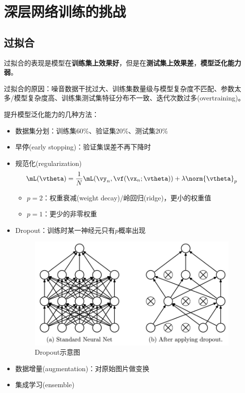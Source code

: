 
\section{深层网络训练的挑战} %
\subsection{过拟合}
过拟合的表现是模型在\textbf{训练集上效果好}，但是在\textbf{测试集上效果差}，\textbf{模型泛化能力弱}。

过拟合的原因：噪音数据干扰过大、训练集数量级与模型复杂度不匹配、参数太多/模型复杂度高、训练集测试集特征分布不一致、迭代次数过多(overtraining)。

提升模型泛化能力的几种方法：
\begin{itemize}
    \item 数据集分划：训练集60\%、验证集20\%、测试集20\%
    \item 早停(early stopping)：验证集误差不再下降时
    \item 规范化(regularization)
    \[\mL(\vtheta)=\frac{1}{N}\mL(\vy_n,\vf(\vx_n;\vtheta))+\lambda\norm{\vtheta}_p\]
    \begin{itemize}
        \item $p=2$：权重衰减(weight decay)/岭回归(ridge)，更小的权重值
        \item $p=1$：更少的非零权重
    \end{itemize}
    \item Dropout：训练时某一神经元只有$p$概率出现
    \begin{figure}[H]
        \centering
        \includegraphics[width=0.6\linewidth]{fig/dropout.jpg}
        \caption{Dropout示意图}
    \end{figure}
    \item 数据增量(augmentation)：对原始图片做变换
    \item 集成学习(ensemble)
\end{itemize}

